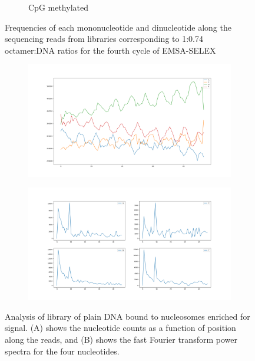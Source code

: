 \documentclass[parskip=full, numbers=noenddot]{scrreprt}
\begin{document}
\begin{figure}[htpb]
\begin{subfigure}[htpb]{0.4\textwidth}
    \caption{CpG methylated}
    \label{fig:freqplots_h8}
  \end{subfigure}
  \caption{Frequencies of each mononucleotide and dinucleotide along the sequencing reads from libraries corresponding to 1:0.74 octamer:DNA ratios for the fourth cycle of EMSA-SELEX}
  \label{fig:freqplots}
\end{figure}

\begin{figure}[htpb]
  \centering
  \begin{subfigure}[htpb]{\textwidth}
    \centering
    \includegraphics[width=\textwidth]{enriched-counts}
    \caption{}
    \label{fig:enriched_counts}
  \end{subfigure}
  \begin{subfigure}[htpb]{\textwidth}
    \centering
    \includegraphics[width=\textwidth]{enriched-power}
    \caption{}
    \label{fig:enriched_power}
  \end{subfigure}
  \caption{Analysis of library of plain DNA bound to nucleosomes enriched for signal. (A) shows the nucleotide counts as a function of position along the reads, and (B) shows the fast Fourier transform power spectra for the four nucleotides.}
  \label{fig:enriched}
\end{figure}
\end{document}

